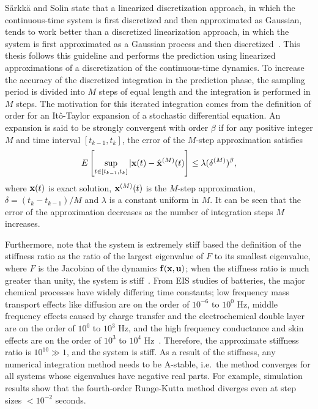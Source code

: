\documentclass[../zhang_thesis.tex]{subfiles}
\begin{document}
S\"arkk\"a and Solin state that a linearized discretization approach, in which the continuous-time system is first discretized and then approximated as Gaussian, tends to work better than a
discretized linearization approach, in which the system is first approximated as a Gaussian process and then discretized~\cite{sarkka12}. This thesis follows this guideline and performs the prediction using linearized approximations of a discretization of the continuous-time dynamics. To increase the accuracy of the discretized integration in the prediction phase, the sampling period is divided into $M$ steps of equal length and the integration is performed in $M$ steps. The motivation
for this iterated integration comes from the definition of order for an It\^o-Taylor expansion of a stochastic differential equation. An expansion is said to be strongly convergent with order $\beta$ if for any positive integer $M$ and time interval $[t_{k-1},t_k]$, the error of the $M$-step approximation satisfies~\cite{kloeden99}
\begin{equation}
    E \left[ \sup_{t\in[t_{k-1},t_k]} |\mathbf{x}(t) - \hat{\mathbf{x}}^{(M)}(t) \right] \le \lambda (\delta^{(M)})^\beta,
\end{equation}
where $\mathbf{x}(t)$ is exact solution, $\mathbf{x}^{(M)}(t)$ is the $M$-step approximation, $\delta=(t_k-t_{k-1})/M$ and $\lambda$ is a constant uniform in $M$. It can be seen that the error of the approximation decreases as the number of integration steps $M$ increases.

Furthermore, note that the system is extremely stiff based the definition of the stiffness ratio as the ratio of the largest eigenvalue of $F$ to its smallest eigenvalue, where $F$ is the Jacobian of the dynamics $\mathbf{f}(\mathbf{x},\mathbf{u})$; when the stiffness ratio is much greater than unity, the system is stiff~\cite{lambert91,brugnano11}. From EIS studies of batteries, the major chemical processes have widely differing time constants; low frequency mass transport effects like
diffusion are on the order of $10^{-6}$ to $10^0$ Hz, middle frequency effects caused by charge transfer and the electrochemical double layer are on the order of $10^0$ to $10^3$ Hz, and the high frequency conductance and skin effects are on the order of $10^3$ to $10^4$ Hz~\cite{jossen06}. Therefore, the approximate stiffness ratio is $10^{10} \gg 1$, and the system is stiff. As a result of the stiffness, any numerical integration method needs to be A-stable, i.e.\ the method
converges for all systems whose eigenvalues have negative real parts. For example, simulation results show that the fourth-order Runge-Kutta method diverges even at step sizes $<10^{-2}$ seconds.
\end{document}
